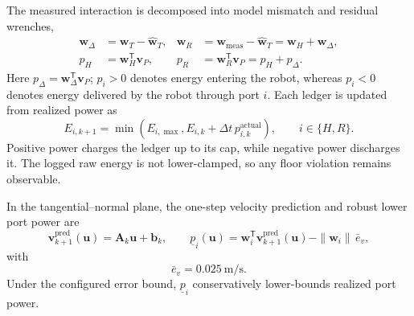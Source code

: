 \begingroup
\small
\setlength{\abovedisplayskip}{5pt}
\setlength{\belowdisplayskip}{5pt}
\setlength{\abovedisplayshortskip}{3pt}
\setlength{\belowdisplayshortskip}{3pt}

The measured interaction is decomposed into model mismatch and residual
wrenches,
\begin{align}
\mathbf w_\Delta
&=
\mathbf w_T-\widehat{\mathbf w}_T,
&
\mathbf w_R
&=
\mathbf w_{\mathrm{meas}}-\widehat{\mathbf w}_T
=
\mathbf w_H+\mathbf w_\Delta,
\\
p_H
&=
\mathbf w_H^\mathsf{T}\mathbf v_P,
&
p_R
&=
\mathbf w_R^\mathsf{T}\mathbf v_P
=
p_H+p_\Delta .
\end{align}
Here $p_\Delta=\mathbf w_\Delta^\mathsf{T}\mathbf v_P$; $p_i>0$ denotes
energy entering the robot, whereas $p_i<0$ denotes energy delivered by the
robot through port $i$. Each ledger is updated from realized power as
\begin{equation}
E_{i,k+1}
=
\min\!\left(
E_{i,\max},
E_{i,k}+\Delta t\,p_{i,k}^{\mathrm{actual}}
\right),
\qquad i\in\{H,R\}.
\end{equation}
Positive power charges the ledger up to its cap, while negative power
discharges it. The logged raw energy is not lower-clamped, so any floor
violation remains observable.

In the tangential--normal plane, the one-step velocity prediction and robust
lower port power are
\begin{equation}
\mathbf v_{k+1}^{\mathrm{pred}}(\mathbf u)
=
\mathbf A_k\mathbf u+\mathbf b_k,
\qquad
\underline p_i(\mathbf u)
=
\mathbf w_i^\mathsf{T}
\mathbf v_{k+1}^{\mathrm{pred}}(\mathbf u)
-
\|\mathbf w_i\|\,\bar e_v,
\end{equation}
with
\[
\bar e_v=0.025~\mathrm{m/s}.
\]
Under the configured error bound, $\underline p_i$ conservatively
lower-bounds realized port power.

